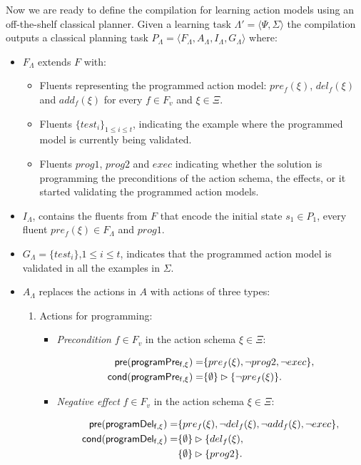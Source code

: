\documentclass[letterpaper]{article} %
\newcommand{\tup}[1]{{\langle #1 \rangle}}
\newcommand{\pre}{\mathsf{pre}}     %
\newcommand{\cond}{\mathsf{cond}}   %
\begin{document}
Now we are ready to define the compilation for learning action models using an off-the-shelf classical planner. Given a learning task $\Lambda'=\tup{\Psi,\Sigma}$ the compilation outputs a classical planning task $P_{\Lambda}=\tup{F_{\Lambda},A_{\Lambda},I_{\Lambda},G_{\Lambda}}$ where:
\begin{itemize}
\item $F_{\Lambda}$ extends $F$ with:
\begin{itemize}
\item Fluents representing the programmed action model: $pre_f(\xi)$, $del_f(\xi)$ and $add_f(\xi)$ for every $f\in F_v$ and $\xi \in \Xi$.
\item Fluents $\{test_i\}_{1\leq i\leq t}$, indicating the example where the programmed model is currently being validated.
\item Fluents $prog1$, $prog2$ and $exec$ indicating whether the solution is programming the preconditions of the action schema, the effects, or it started validating the programmed action models.
\end{itemize}
\item $I_{\Lambda}$, contains the fluents from $F$ that encode the initial state $s_1\in P_1$, every fluent $pre_f(\xi)\in F_{\Lambda}$ and $prog1$. 
\item $G_{\Lambda}=\{test_i\}$,{\small $1\leq i\leq t$}, indicates that the programmed action model is validated in all the examples in $\Sigma$.
\item $A_{\Lambda}$ replaces the actions in $A$ with actions of three types:
\begin{enumerate}
\item Actions for programming:

\begin{itemize}
\item {\em Precondition} $f\in F_v$ in the action schema $\xi\in\Xi$:
\begin{small}
\begin{align*}
\hspace*{7pt}\pre(\mathsf{programPre_{f,\xi}})=&\{pre_{f}(\xi),\neg prog2,\neg exec\},\\    
\cond(\mathsf{programPre_{f,\xi}})=&\{\emptyset\}\rhd\{\neg pre_{f}(\xi)\}.
\end{align*}
\end{small}

\item {\em Negative effect} $f\in F_v$ in the action schema $\xi\in\Xi$:
\begin{small}
\begin{align*}
\hspace*{7pt}\pre(\mathsf{programDel_{f,\xi}})=&\{pre_{f}(\xi),\neg del_{f}(\xi),\neg add_{f}(\xi),\neg exec\},\\                                                   
\cond(\mathsf{programDel_{f,\xi}})=&\{\emptyset\}\rhd\{del_{f}(\xi),\\
&\{\emptyset\}\rhd\{prog2\}.
\end{align*}
\end{small}


\end{itemize}
\end{enumerate}
\end{itemize}
\end{document}
